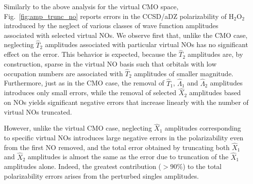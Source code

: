 Similarly to the above analysis for the virtual CMO space,
Fig.~\ref{fig:amp_trunc_no} reports errors in the CCSD/aDZ polarizability of
H$_2$O$_2$ introduced by the neglect of various classes of wave function
amplitudes associated with selected virtual NOs.  We observe first that,
unlike the CMO case, neglecting $\hat{T}_2$ amplitudes associated with
particular virtual NOs has no significant effect on the error.  This behavior
is expected, because the $\hat{T}_2$ amplitudes are, by construction, sparse
in the virtual NO basis such that orbitals with low occupation numbers are
associated with $\hat{T}_2$ amplitudes of smaller magnitude.  Furthermore,
just as in the CMO case, the removal of $\hat{T}_1$, $\hat{\Lambda}_1$ and
$\hat{\Lambda}_2$ amplitudes introduces only small errors, while the removal
of selected $\hat{X}_2$ amplitudes based on NOs yields significant negative
errors that increase linearly with the number of virtual NOs truncated.

However, unlike the virtual CMO case, neglecting $\hat{X}_1$ amplitudes
corresponding to specific virtual NOs introduces large negative errors in the
polarizability even from the first NO removed, and the total error obtained by
truncating both $\hat{X}_1$ and $\hat{X}_2$ amplitudes is almost the same as
the error due to truncation of the $\hat{X}_1$ amplitudes alone.  Indeed, 
the greatest contribution ($>90\%$) to the
total polarizability errors arises from the perturbed singles amplitudes.

